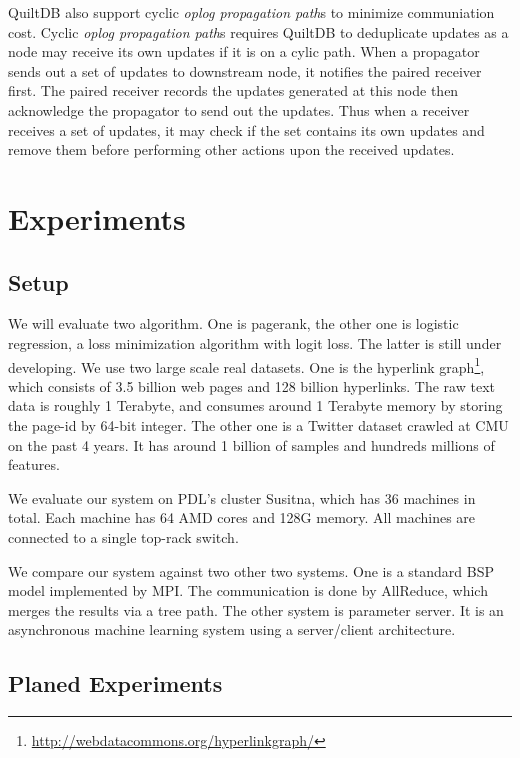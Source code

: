 \documentclass[11pt, twocolumn]{article}
\begin{document}
QuiltDB also support cyclic \emph{oplog propagation path}s to minimize
communiation cost. Cyclic \emph{oplog propagation path}s requires QuiltDB to
deduplicate updates as a node may receive its own updates if it is on a cylic
path. When a propagator sends out a set of updates to downstream node, it
notifies the paired receiver first. The paired receiver records the updates
generated at this node then acknowledge the propagator to send out the updates.
Thus when a receiver receives a set of updates, it may check if the set contains
its own updates and remove them before performing other actions upon the
received updates.




\section{Experiments}

\subsection{Setup}

We will evaluate two algorithm. One is pagerank, the other one is logistic
regression, a loss minimization algorithm with logit loss. The latter is still
under developing. We use two large scale real datasets. One is the hyperlink
graph\footnote{\url{http://webdatacommons.org/hyperlinkgraph/}}, which consists
of 3.5 billion web pages and 128 billion hyperlinks. The raw text data is
roughly 1 Terabyte, and consumes around 1 Terabyte memory by storing the page-id
by 64-bit integer. The other one is a Twitter dataset crawled at CMU on the past
4 years. It has around 1 billion of samples and hundreds millions of
features.

We evaluate our system on PDL's cluster Susitna, which has 36 machines in
total. Each machine has 64 AMD cores and 128G memory. All machines are connected
to a single top-rack switch.

We compare our system against two other two systems. One is a standard BSP
model implemented by MPI. The communication is done by AllReduce, which merges
the results via a tree path. The other system is parameter server. It is an
asynchronous machine learning system using a server/client architecture.

\subsection{Planed Experiments}
\end{document}
